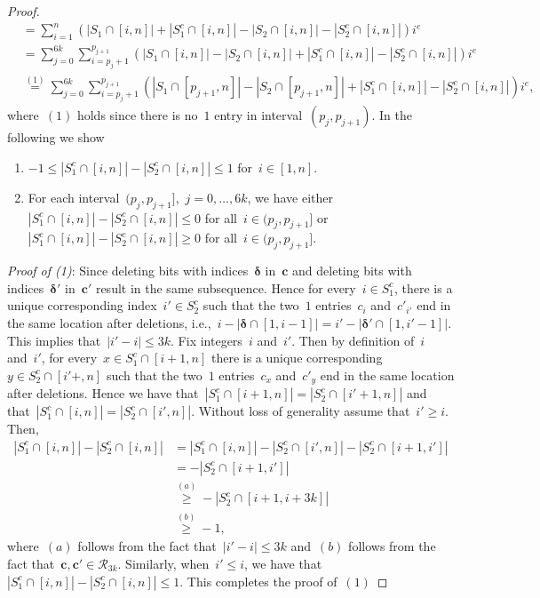 \documentclass[10pt,a4paper,onecolumn]{IEEEtran}
\newcommand{\1}{\mathbbold{1}}
\newcommand{\cR}{\mathcal{R}}
\newcommand{\boldc}{\mathbf{c}}
\begin{document}
\begin{proof}
\begin{align}
    &= \sum^n_{i=1}(|S_1\cap[i,n]|+|S^c_1\cap[i,n]|-|S_2\cap[i,n]|-|S^c_2\cap[i,n]|)i^e\nonumber\\
    &=\sum^{6k}_{j=0}\sum^{p_{j+1}}_{i=p_{j}+1}(|S_1\cap[i,n]|-|S_2\cap[i,n]|+|S^c_1\cap[i,n]|-|S^c_2\cap[i,n]|)i^e\nonumber\\
    &\overset{(1)}{=}\sum^{6k}_{j=0}\sum^{p_{j+1}}_{i=p_{j}+1}(|S_1\cap[p_{j+1},n]|-|S_2\cap[p_{j+1},n]|+|S^c_1\cap[i,n]|-|S^c_2\cap[i,n]|)i^e,
\end{align}
where~$(1)$ holds since there is no~$1$ entry in interval~$(p_j,p_{j+1})$.
In the following we show
\begin{enumerate}
    \item $-1\le |S^c_1\cap[i,n]|-|S^c_2\cap[i,n]|\le 1$ for~$i\in [1,n]$.
    \item  For each interval~$(p_j,p_{j+1}]$,~$j=0,\ldots,6k$, we have either~$|S^c_1\cap[i,n]|-|S^c_2\cap[i,n]|\le 0$ for all~$i\in (p_j,p_{j+1}]$ or
$|S^c_1\cap[i,n]|-|S^c_2\cap[i,n]|\ge 0$
for all~$i\in (p_j,p_{j+1}]$. 
\end{enumerate}
\emph{Proof of (1)}: 
Since deleting bits with indices~$\boldsymbol{\delta}$ in~$\boldc$ and deleting bits with indices~$\boldsymbol{\delta'}$ in~$\boldc'$ result in the same subsequence.
Hence for every~$i\in S^c_1$, there is a unique corresponding index~$i'\in S^c_2$ such that the two~$1$ entries~$c_i$ and~$c'_{i'}$ end in the same location after deletions, i.e.,~$i-|\boldsymbol{\delta}\cap [1,i-1]|=i'-|\boldsymbol{\delta}'\cap [1,i'-1]|$. This implies that~$|i'-i|\le 3k$. 
Fix integers~$i$ and~$i'$. Then by definition of~$i$ and~$i'$, for every~$x\in S^c_1\cap [i+1,n]$ there is a unique corresponding~$y\in S^c_2\cap[i'+,n]$ such that the two~$1$ entries~$c_x$ and~$c'_y$ end in the same location after deletions. Hence we have that~$|S^c_1\cap[i+1,n]|=|S^c_2\cap[i'+1,n]|$ and that~$|S^c_1\cap[i,n]|=|S^c_2\cap[i',n]|$. Without loss of generality assume that~$i'\ge i$. Then,
\begin{align*}
    |S^c_1\cap[i,n]|-|S^c_2\cap[i,n]|&=|S^c_1\cap[i,n]|-|S^c_2\cap[i',n]|-
    |S^c_2\cap[i+1,i']|\\
    &=-|S^c_2\cap[i+1,i']|\\
    &\overset{(a)}{\ge} -|S^c_2\cap[i+1,i+3k]|\\
    &\overset{(b)}{\ge} -1,
\end{align*}
where~$(a)$ follows from the fact that~$|i'-i|\le 3k$ and~$(b)$ follows from the fact that~$\boldc,\boldc'\in\cR_{3k}$. Similarly, when~$i'\le i$, we have that~$|S^c_1\cap[i,n]|-|S^c_2\cap[i,n]|\le 1$. This completes the proof of~$(1)$



\end{proof}
\end{document}
